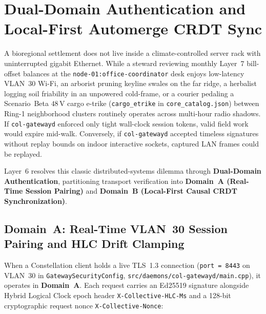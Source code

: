 \section{Dual-Domain Authentication and Local-First Automerge CRDT Sync}
\label{sec:dual-domain-crdt}

A bioregional settlement does not live inside a climate-controlled server rack with uninterrupted gigabit Ethernet. While a steward reviewing monthly Layer~7 bill-offset balances at the \texttt{node-01:office-coordinator} desk enjoys low-latency VLAN~30 Wi-Fi, an arborist pruning keyline swales on the far ridge, a herbalist logging soil friability in an unpowered cold-frame, or a courier pedaling a Scenario~Beta $48\,\mathrm{V}$ cargo e-trike (\texttt{cargo\_etrike} in \texttt{core\_catalog.json}) between Ring-1 neighborhood clusters routinely operates across multi-hour radio shadows. If \texttt{col-gatewayd} enforced only tight wall-clock session tokens, valid field work would expire mid-walk. Conversely, if \texttt{col-gatewayd} accepted timeless signatures without replay bounds on indoor interactive sockets, captured LAN frames could be replayed.

Layer~6 resolves this classic distributed-systems dilemma \parencite{saltzer1984end,rose2020zero} through \textbf{Dual-Domain Authentication}, partitioning transport verification into \textbf{Domain~A (Real-Time Session Pairing)} and \textbf{Domain~B (Local-First Causal CRDT Synchronization)}.

\subsection{Domain~A: Real-Time VLAN~30 Session Pairing and HLC Drift Clamping}
\label{subsec:domain-a}

When a Constellation client holds a live TLS~1.3 connection (\texttt{port = 8443} on VLAN~30 in \texttt{GatewaySecurityConfig}, \texttt{src/daemons/col-gatewayd/main.cpp}), it operates in \textbf{Domain~A}. Each request carries an Ed25519 signature alongside Hybrid Logical Clock \parencite{kulkarni2014logical,lamport1978time} epoch header \texttt{X-Collective-HLC-Ms} and a 128-bit cryptographic request nonce \texttt{X-Collective-Nonce}:

